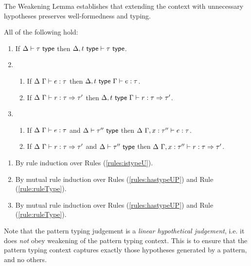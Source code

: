 {{{{The Weakening Lemma establishes that extending the context with unnecessary hypotheses preserves well-formedness and typing.
\begin{lemma}[Weakening]\label{lemma:weakening-UP} All of the following hold: 
\begin{enumerate} 
\item If $\Delta \vdash \tau~\mathsf{type}$ then $\Delta, t~\mathsf{type} \vdash \tau~\mathsf{type}$.
\item \begin{enumerate}
  \item If $\Delta~\Gamma \vdash e : \tau$ then $\Delta, t~\mathsf{type}~\Gamma \vdash e : \tau$.
  \item If $\Delta~\Gamma \vdash r : \tau \Rightarrow \tau'$ then $\Delta, t~\mathsf{type}~\Gamma \vdash r : \tau \Rightarrow \tau'$.
  \end{enumerate}
\item \begin{enumerate}
  \item If $\Delta~\Gamma \vdash e : \tau$ and $\Delta \vdash \tau''~\mathsf{type}$ then $\Delta~\Gamma, x : \tau'' \vdash e : \tau$.
  \item If $\Delta~\Gamma \vdash r : \tau \Rightarrow \tau'$ and $\Delta \vdash \tau''~\mathsf{type}$ then $\Delta~\Gamma, x : \tau'' \vdash r : \tau \Rightarrow \tau'$.
  \end{enumerate}
\end{enumerate}
\end{lemma}
\begin{proof-sketch}
\begin{enumerate}
\item By rule induction over Rules (\ref{rules:istypeU}).
\item By mutual rule induction over Rules (\ref{rules:hastypeUP}) and Rule (\ref{rule:ruleType}).
\item By mutual rule induction over Rules (\ref{rules:hastypeUP}) and Rule (\ref{rule:ruleType}).
\end{enumerate}
\end{proof-sketch}
Note that the {pattern typing judgement} is a \emph{linear hypothetical judgement}, i.e. it does \emph{not} obey weakening of the pattern typing context. This is to ensure that the pattern typing context captures exactly those hypotheses generated by a pattern, and no others.

}}}}
